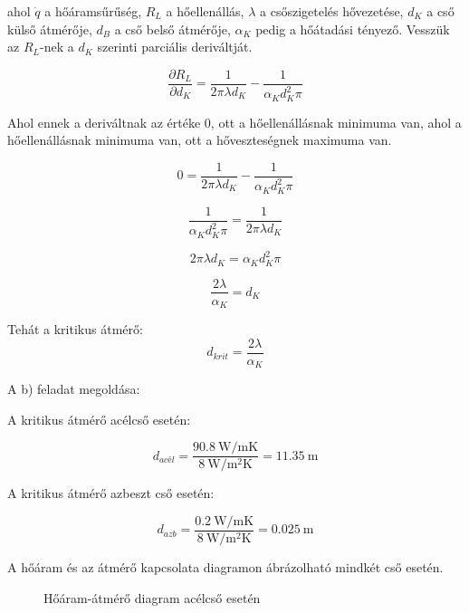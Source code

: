 ahol \(\dot{q}\) a hőáramsűrűség, \(R_L\) a hőellenállás, \(\lambda\) a csőszigetelés hővezetése, \(d_K\) a cső külső átmérője, \(d_B\) a cső belső átmérője, \(\alpha_K\) pedig a hőátadási tényező. Vesszük az \(R_L\)-nek a \(d_K\) szerinti parciális deriváltját.

\begin{equation}
	\frac{\partial R_L}{\partial d_K} = \frac{1}{2 \pi \lambda d_K} - \frac{1}{\alpha_K d_K^2 \pi}
\end{equation}

Ahol ennek a deriváltnak az értéke \(0\), ott a hőellenállásnak minimuma van, ahol a hőellenállásnak minimuma van, ott a hőveszteségnek maximuma van.

\[0 = \frac{1}{2 \pi \lambda d_K}-\frac{1}{\alpha_K d_K^2 \pi}\]

\[\frac{1}{\alpha_K d_K^2 \pi} = \frac{1}{2 \pi \lambda d_K}\]

\[2 \pi \lambda d_K = \alpha_K d_K^2 \pi\]

\[\frac{2 \lambda}{\alpha_K} = d_K\]

Tehát a kritikus átmérő:
\begin{equation}
	d_{krit} = \frac{2 \lambda}{\alpha_K}
\end{equation}

A b) feladat megoldása:

A kritikus átmérő acélcső esetén:

\[d_{\textit{acél}} = \frac{ \SI{90,8}{\watt\per\meter\kelvin}}{\SI{8}{\watt\per\meter\squared\kelvin}} = \SI{11,35}{\meter}\]

A kritikus átmérő azbeszt cső esetén:

\[d_{azb} = \frac{ \SI{0,2}{\watt\per\meter\kelvin}}{\SI{8}{\watt\per\meter\squared\kelvin}} = \SI{0,025}{\meter}\]

A hőáram és az átmérő kapcsolata diagramon ábrázolható mindkét cső esetén.

\begin{figure}[h]
	\centering
	\label{figure:guh7ud-vgpvd}
	\caption{Hőáram-átmérő diagram acélcső esetén}
\end{figure}

